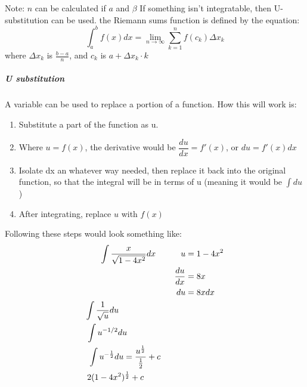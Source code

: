 \documentclass{article} %
\theoremstyle{theorem}
\theoremstyle{definition}
\begin{document}
                    Note: $n$ can be calculated if $a$ and $\beta$
                    If something isn't integratable, then U-substitution can be used.
                    the Riemann sums function is defined by the equation:
                    \begin{equation}
                        \int^b_a f(x)dx = \lim_{n \to \infty} \sum_{k=1}^{n}f(c_k)\Delta x_k
                    \end{equation}
                    where $\Delta x_k$ is $\frac{b-a}{n}$, and $c_k$ is $a+\Delta x_k \cdot k$
                \subparagraph{U substitution}
                    A variable can be used to replace a portion of a function. How this will work is:
                    \begin{enumerate}
                        \item Substitute a part of the function as u.
                        \item Where $u = f(x)$, the derivative would be $\dfrac{du}{dx} = f'(x)$, or $du = f'(x)dx$
                        \item Isolate dx an whatever way needed, then replace it back into the original function, so that the integral will be in terms of u (meaning it would be $\int du$)
                        \item After integrating, replace $u$ with $f(x)$
                    \end{enumerate}
                    Following these steps would look something like:
                    \begin{align*}
                        \int \dfrac{x}{\sqrt{1-4x^2}}dx \hspace{30px}
                        u &= 1-4x^2\\
                        \dfrac{du}{dx} &= 8x\\
                        du&=8xdx \\
                        \int \dfrac{1}{\sqrt{u}}du \hspace{80px}\\
                        \int u^{-1/2}du \hspace{70px}\\
                        \int u^{-\frac{1}{2}}du = \dfrac{u^{\frac{1}{2}}}{\frac{1}{2}}+c\hspace{30px}\\
                        2(1-4x^2)^{\frac{1}{2}}+c\hspace*{50px}
                    \end{align*}
\end{document}
